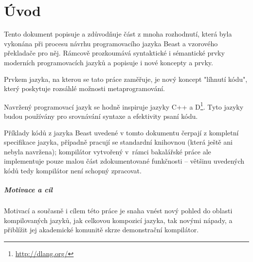 
\newcommand{\ctime}{\inlineCode{@ctime}\xspace}
\newcommand{\nonctime}{ne-\inlineCode{@ctime}\xspace}

\chapter{Úvod}
Tento dokument popisuje a zdůvodňuje část z mnoha rozhodnutí, která byla vykonána při procesu návrhu programovacího jazyka Beast a vzorového překladače pro něj. Rámcově prozkoumává syntaktické i sémantické prvky moderních programovacích jazyků a popisuje i nové koncepty a prvky.

Prvkem jazyka, na kterou se tato práce zaměřuje, je nový koncept "líhnutí kódu", který poskytuje rozsáhlé možnosti metaprogramování.

Navržený programovací jazyk se hodně inspiruje jazyky C++ a D\footnote{\url{http://dlang.org/}}. Tyto jazyky budou používány pro srovnávání syntaxe a efektivity psaní kódu.

Příklady kódů z jazyka Beast uvedené v tomto dokumentu čerpají z kompletní specifikace jazyka, případně pracují se standardní knihovnou (která ještě ani nebyla navržena); kompilátor vytvořený v~rámci bakalářské práce ale implementuje pouze malou část zdokumentované funkčnosti -- většinu uvedených kódů tedy kompilátor není schopný zpracovat.

\paragraph{Motivace a cíl}
Motivací a současně i cílem této práce je snaha vnést nový pohled do oblasti kompilovaných jazyků, jak celkovou kompozicí jazyka, tak novými nápady, a přiblížit jej akademické komunitě skrze demonstrační kompilátor.

